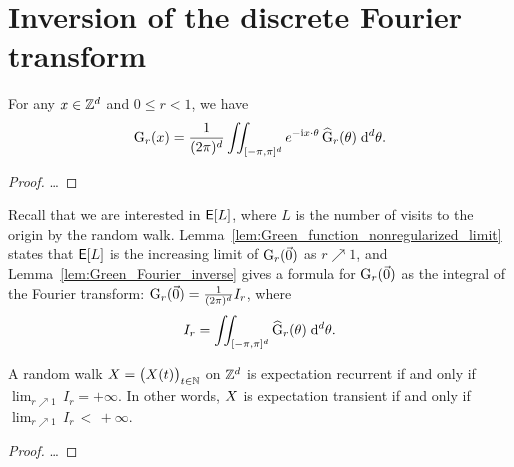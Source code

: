 \section{Inversion of the discrete Fourier transform}

\begin{lemma}
  \label{lem:Green_Fourier_inverse}
  For any $x \in \mathbb{Z}^d$ and $0 \le r < 1$, we have
  \begin{align*}
  \mathrm{G}_{r} (x)
  = \frac{1}{(2\pi)^d} \iint_{[-\pi,\pi]^d} e^{-\mathrm{i} x \cdot \theta} \, \widehat{\mathrm{G}}_{r} (\theta) \; \mathrm{d}^d \theta .
  \end{align*}
\end{lemma}
\begin{proof}
\ldots
\end{proof}

Recall that we are interested in $\mathsf{E}[L]$, where $L$ is the number of visits to the
origin by the random walk. Lemma~\ref{lem:Green_function_nonregularized_limit}
states that $\mathsf{E}[L]$ is the increasing limit of $\mathrm{G}_{r}(\vec{0})$ as $r \nearrow 1$,
and Lemma~\ref{lem:Green_Fourier_inverse} gives a formula for $\mathrm{G}_{r}(\vec{0})$
as the integral of the Fourier transform: $\mathrm{G}_{r}(\vec{0}) = \frac{1}{(2\pi)^d} I_r$,
where
\begin{align}
I_r = \iint_{[-\pi,\pi]^d} \widehat{\mathrm{G}}_{r} (\theta) \; \mathrm{d}^d \theta .
\end{align}

\begin{corollary}
  \label{cor:recurrence_iff_finite_limit_integral}
  A random walk $X = \big(X(t)\big)_{t \in \mathbb{N}}$ on $\mathbb{Z}^d$
  is expectation recurrent if and only if $\lim_{r \nearrow 1} \, I_r = +\infty$.
  In other words, $X$ is expectation transient if and only if
  $\lim_{r \nearrow 1} \, I_r \, < \, +\infty$.
\end{corollary}
\begin{proof}
\ldots
\end{proof}



